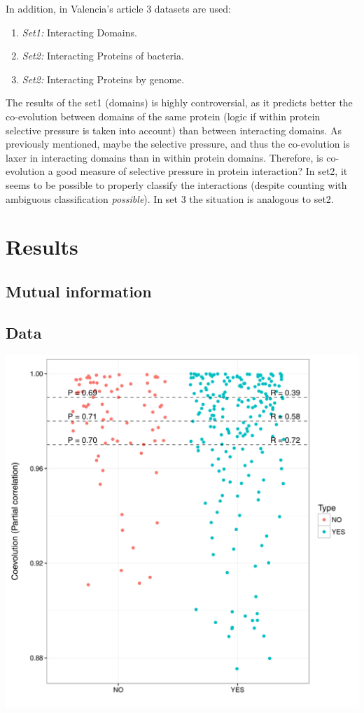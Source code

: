 \documentclass[11pt]{article}
\begin{document}
In addition, in Valencia's article\cite{Pazos2001} 3 datasets are used:
\begin{enumerate}
\setlength{\itemsep}{1pt}
	\item \textit{Set1:} Interacting Domains.
	\item \textit{Set2:} Interacting Proteins of bacteria.
	\item \textit{Set2:} Interacting Proteins by genome.
\end{enumerate}
The results of the set1 (domains) is highly controversial, as it predicts better the co-evolution between domains of the same protein (logic if within protein selective pressure is taken into account) than between interacting domains. As previously mentioned, maybe the selective pressure, and thus the co-evolution is laxer in interacting domains than in within protein domains. Therefore, is co-evolution a good measure of selective pressure in protein interaction?
In set2, it seems to be possible to properly classify the interactions (despite counting with ambiguous classification \textit{possible}). In set 3 the situation is analogous to set2.


\section{Results}
\subsection{Mutual information}
\subsection{Data}
\includegraphics{partial_corr}



	
\end{document}

